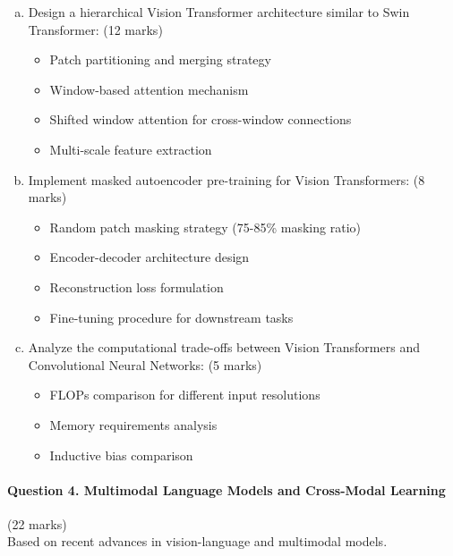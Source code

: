 \documentclass[12pt]{article}
\newcommand{\shortanswer}{\vspace{2cm}}
\newcommand{\mediumanswer}{\vspace{3cm}}
\newcommand{\journalspace}{\vspace{4.5cm}}
\begin{document}
\begin{enumerate}[(a)]
    \item Design a hierarchical Vision Transformer architecture similar to Swin Transformer: \hfill (12 marks)
    \begin{itemize}
        \item Patch partitioning and merging strategy
        \item Window-based attention mechanism
        \item Shifted window attention for cross-window connections
        \item Multi-scale feature extraction
    \end{itemize}
    
    \journalspace
    
    \item Implement masked autoencoder pre-training for Vision Transformers: \hfill (8 marks)
    \begin{itemize}
        \item Random patch masking strategy (75-85\% masking ratio)
        \item Encoder-decoder architecture design
        \item Reconstruction loss formulation
        \item Fine-tuning procedure for downstream tasks
    \end{itemize}
    
    \mediumanswer
    
    \item Analyze the computational trade-offs between Vision Transformers and Convolutional Neural Networks: \hfill (5 marks)
    \begin{itemize}
        \item FLOPs comparison for different input resolutions
        \item Memory requirements analysis
        \item Inductive bias comparison
    \end{itemize}
    
    \shortanswer
\end{enumerate}

\newpage
\paragraph{Question 4. Multimodal Language Models and Cross-Modal Learning}\hfill (22 marks)\\
Based on recent advances in vision-language and multimodal models.
\end{document}

